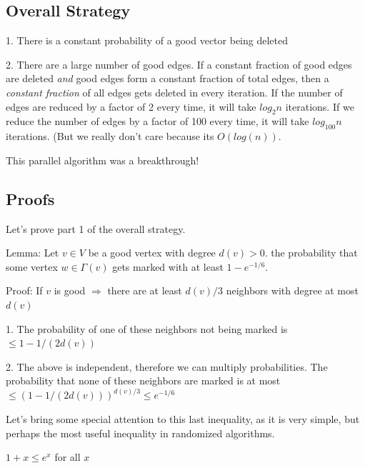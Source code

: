 \documentclass[twoside]{article}
\begin{document}
\subsection{Overall Strategy}
1.  There is a constant probability of a good vector being deleted

2.  There are a large number of good edges.  If a constant fraction of good edges are deleted \textit{and} good edges form a constant fraction of total edges, then a \textit{constant fraction} of all edges gets deleted in every iteration.  If the number of edges are reduced by a factor of 2 every time, it will take $log_2n$ iterations.  If we reduce the number of edges by a factor of 100 every time, it will take $log_{100}n$ iterations.  (But we really don't care because its $O(log(n))$.

This parallel algorithm was a breakthrough!

\clearpage
\subsection{Proofs}
Let's prove part 1 of the overall strategy.

Lemma:  Let $v \in V$ be a good vertex with degree $d(v) > 0$.  the probability that some vertex $w \in \Gamma (v)$ gets marked with at least $1 - e^{-1/6}$.

Proof: If $v$ is good $\Rightarrow $ there are at least $d(v)/3$ neighbors with degree at most $d(v)$

1.  The probability of one of these neighbors not being marked is $\leq 1 - 1/(2d(v))$


2. The above is independent, therefore we can multiply probabilities.  The probability that none of these neighbors are marked is at most $\leq (1 - 1/(2d(v)))^{d(v)/3} \leq e^{-1/6}$


Let's bring some special attention to this last inequality, as it is very simple, but perhaps the most useful inequality in randomized algorithms.

\begin{center}
$1 + x \leq e^x $ for all $x$
\end{center}
\end{document}
